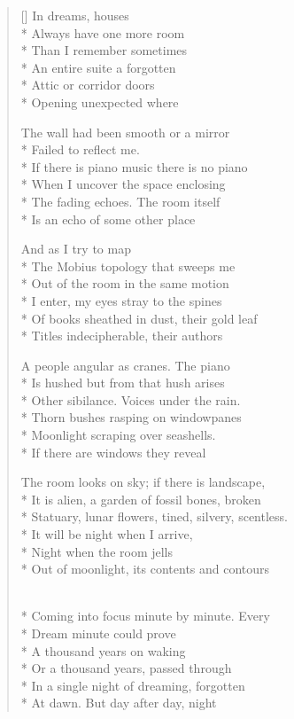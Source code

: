 \label{ch:dream_house}
\settowidth{\versewidth}{Statuary, lunar flowers, tined, silvery, scentless.}
\begin{verse}[\versewidth]
In dreams, houses\\*
Always have one more room\\*
Than I remember     sometimes\\*
An entire suite     a forgotten\\*
Attic or corridor     doors\\*
Opening unexpected where

The wall had been smooth or a mirror\\*
Failed to reflect me.\\*
If there is piano music there is no piano\\*
When I uncover the space enclosing\\*
The fading echoes.  The room itself\\*
Is an echo of some other place

And as I try to map\\*
The Mobius topology that sweeps me\\*
Out of the room in the same motion\\*
I enter, my eyes stray to the spines\\*
Of books sheathed in dust, their gold leaf\\*
Titles indecipherable, their authors

A people angular as cranes.   The piano\\*
Is hushed but from that hush arises\\*
Other sibilance.   Voices under the rain.\\*
Thorn bushes rasping on windowpanes\\*
Moonlight scraping over seashells.\\*
If there are windows they reveal

The room looks on sky; if there is landscape,\\*
It is alien, a garden of fossil bones, broken\\*
Statuary, lunar flowers, tined, silvery, scentless.\\*
It will be night when I arrive,\\*
Night when the room jells\\*
Out of moonlight, its contents and contours

\\*
Coming into focus minute by minute.  Every\\*
Dream minute could prove\\*
A thousand years on waking\\*
Or a thousand years, passed through\\*
In a single night of dreaming, forgotten\\*
At dawn.  But day after day, night


\end{verse}
